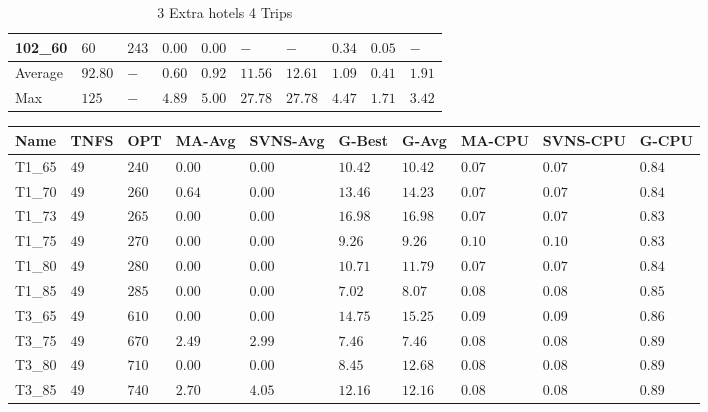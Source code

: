 \begin{center}
\begin{table}[]
\begin{adjustwidth}{-0.4in}{-1in}
\begin{tabular}{|lll|l|l|ll|lll|}
102\_60 & $60   $ & $243 $ & $\bm{0.00}$ & $\bm{0.00}$   & $-$     & $-$     & $0.34$ & $0.05$   & $-   $ \\
\hline
Average & $92.80$ & $-   $ & $0.60$ & $0.92$   & $11.56$ & $12.61$ & $1.09$ & $0.41$   & $1.91$ \\
Max     & $125  $ & $-   $ & $4.89$ & $5.00$   & $27.78$ & $27.78$ & $4.47$ & $1.71$   & $3.42$ \\
\hline
\end{tabular}
    \end{adjustwidth}
    \caption{3 Extra hotels 4 Trips}
    \label{3-4}
    \end{table}
\end{center}
\begin{center}
    \begin{table}[]
    \centering
    \begin{adjustwidth}{-0.4in}{-1in}
    \begin{tabular}{|lll|l|l|ll|lll|}
\hline
Name    & TNFS    & OPT    & MA-Avg &SVNS-Avg& G-Best  & G-Avg   & MA-CPU & SVNS-CPU & G-CPU \\
\hline
T1\_65   & $49  $ & $240 $ & $\bm{0.00}$ & $\bm{0.00}$ & $10.42$ & $10.42$ & $0.07$ & $0.07$   & $0.84$ \\
T1\_70   & $49  $ & $260 $ & $0.64$ & $\bm{0.00}$ & $13.46$ & $14.23$ & $0.07$ & $0.07$   & $0.84$ \\
T1\_73   & $49  $ & $265 $ & $\bm{0.00}$ & $\bm{0.00}$ & $16.98$ & $16.98$ & $0.07$ & $0.07$   & $0.83$ \\
T1\_75   & $49  $ & $270 $ & $\bm{0.00}$ & $\bm{0.00}$ & $9.26$  & $9.26$  & $0.10$ & $0.10$   & $0.83$ \\
T1\_80   & $49  $ & $280 $ & $\bm{0.00}$ & $\bm{0.00}$ & $10.71$ & $11.79$ & $0.07$ & $0.07$   & $0.84$ \\
T1\_85   & $49  $ & $285 $ & $\bm{0.00}$ & $\bm{0.00}$ & $7.02$  & $8.07$  & $0.08$ & $0.08$   & $0.85$ \\
\hline
T3\_65   & $49  $ & $610 $ & $\bm{0.00}$ & $\bm{0.00}$ & $14.75$ & $15.25$ & $0.09$ & $0.09$   & $0.86$ \\
T3\_75   & $49  $ & $670 $ & $2.49$ & $2.99$ & $7.46$  & $7.46$  & $0.08$ & $0.08$   & $0.89$ \\
T3\_80   & $49  $ & $710 $ & $\bm{0.00}$ & $\bm{0.00}$ & $8.45$  & $12.68$ & $0.08$ & $0.08$   & $0.89$ \\
T3\_85   & $49  $ & $740 $ & $2.70$ & $4.05$ & $12.16$ & $12.16$ & $0.08$ & $0.08$   & $0.89$ \\

\end{tabular}
\end{adjustwidth}
\end{table}
\end{center}
